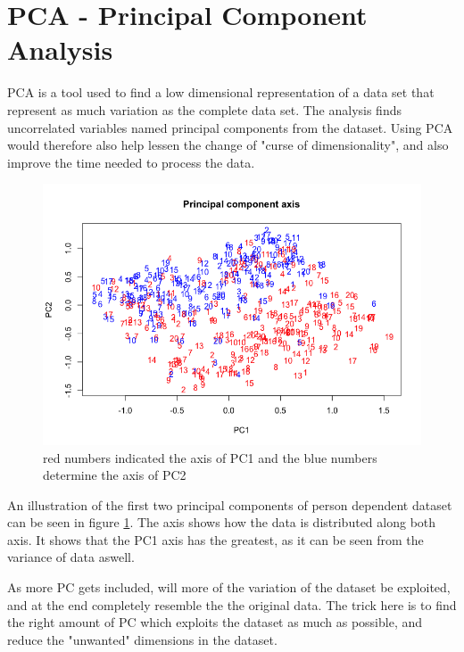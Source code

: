 \section{PCA - Principal Component Analysis}
PCA is a tool used to find a low dimensional representation
of a data set that represent as much variation as the complete data set. 
  The analysis finds uncorrelated variables named principal components from the dataset.
  Using PCA would therefore also help lessen the change of "curse of dimensionality",
   and also improve the time needed to process the data. 

\begin{figure}[H]
\centering
\includegraphics[width = \textwidth]{graphics/PCa-axis.png}
\caption{ red numbers indicated the axis of PC1 and the blue numbers determine the axis of PC2}
\label{fig:pca_vis}
\end{figure}

An illustration of the first two principal components of person dependent
dataset can be seen in figure \ref{fig:pca_vis}.
The axis shows how the data is distributed along both axis. 
It shows that the PC1 axis has the greatest, as it can be seen from the variance of data aswell. 


As more PC gets included, will more of the variation of the dataset be exploited,
and at the end completely resemble the the original data.
The trick here is to find the right amount of PC which exploits the dataset as
much as possible, and reduce the "unwanted" dimensions in the dataset. 

